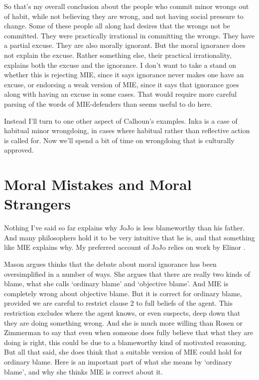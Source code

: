 So that's my overall conclusion about the people who commit minor wrongs out of habit, while not believing they are wrong, and not having social pressure to change. Some of these people all along had desires that the wrongs not be committed. They were practically irrational in committing the wrongs. They have a partial excuse. They are also morally ignorant. But the moral ignorance does not explain the excuse. Rather something else, their practical irrationality, explains both the excuse and the ignorance. I don't want to take a stand on whether this is rejecting MIE, since it says ignorance never makes one have an excuse, or endorsing a weak version of MIE, since it says that ignorance goes along with having an excuse in some cases. That would require more careful parsing of the words of MIE-defenders than seems useful to do here.

Instead I'll turn to one other aspect of Calhoun's examples. \gls{Inka} is a case of habitual minor wrongdoing, in cases where habitual rather than reflective action is called for. Now we'll spend a bit of time on wrongdoing that is culturally approved.

\section{Moral Mistakes and Moral Strangers}
\label{moralmistakesandmoralstrangers}

Nothing I've said so far explains why \gls{JoJo} is less blameworthy than his father. And many philosophers hold it to be very intuitive that he is, and that something like MIE explains why. My preferred account of \gls{JoJo} relies on work by Elinor \citet{Mason2015}.

Mason argues thinks that the debate about moral ignorance has been oversimplified in a number of ways. She argues that there are really two kinds of blame, what she calls `ordinary blame' and `objective blame'. And MIE is completely wrong about objective blame. But it is correct for ordinary blame, provided we are careful to restrict clause 2 to full beliefs of the agent. This restriction excludes where the agent knows, or even suspects, deep down that they are doing something wrong. And she is much more willing than Rosen or Zimmerman to say that even when someone does fully believe that what they are doing is right, this could be due to a blameworthy kind of motivated reasoning. But all that said, she does think that a suitable version of MIE could hold for ordinary blame. Here is an important part of what she means by `ordinary blame', and why she thinks MIE is correct about it.

